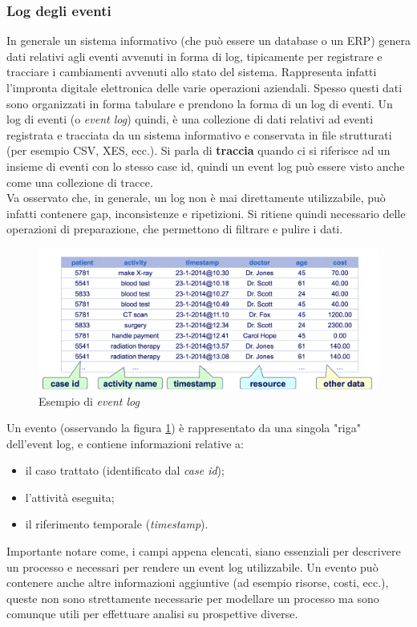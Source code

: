 \subsubsection{Log degli eventi}
In generale un sistema informativo (che può essere un database o un \gls{ERP}) genera dati relativi agli eventi avvenuti in forma di log, tipicamente per registrare e tracciare i cambiamenti avvenuti allo stato del sistema.
Rappresenta infatti l'impronta digitale elettronica delle varie operazioni aziendali.
Spesso questi dati sono organizzati in forma tabulare e prendono la forma di un log di eventi.
Un log di eventi (o \textit{event log}) quindi, è una collezione di dati relativi ad eventi registrata e tracciata da un sistema informativo e conservata in file strutturati (per esempio CSV, XES, ecc.).
Si parla di \textbf{traccia} quando ci si riferisce ad un insieme di eventi con lo stesso case id, quindi un event log può essere visto anche come una collezione di tracce.
\\ 
Va osservato che, in generale, un log non è mai direttamente utilizzabile, può infatti contenere gap, inconsistenze e ripetizioni. Si ritiene quindi necessario delle operazioni di preparazione, che permettono di filtrare e pulire i dati.

\begin{figure}[H] 
    \centering 
    \includegraphics[width=0.9\columnwidth]{immagini/event_log_ex.png} 
    \caption{Esempio di \textit{event log} \cite{site:event-log-img}}
    \label{fig:event-log-img}
\end{figure}

Un evento (osservando la figura \ref{fig:event-log-img}) è rappresentato da una singola "riga" dell'event log, e contiene informazioni relative a:
\begin{itemize}
\item il caso trattato (identificato dal \textit{case id});
\item l'attività eseguita;
\item il riferimento temporale (\textit{timestamp}).
\end{itemize}
Importante notare come, i campi appena elencati, siano essenziali per descrivere un processo e necessari per rendere un event log utilizzabile.
Un evento può contenere anche altre informazioni aggiuntive (ad esempio risorse, costi, ecc.), queste non sono strettamente necessarie per modellare un processo ma sono comunque utili per effettuare analisi su prospettive diverse.

